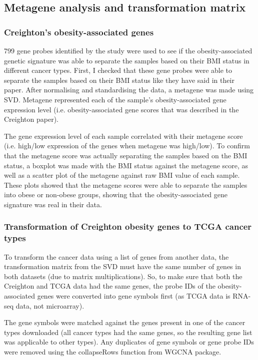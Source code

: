 \documentclass[a4paper, 11pt]{article}
\begin{document}
\subsection*{Metagene analysis and transformation matrix}

\subsubsection*{Creighton's obesity-associated genes}

799 gene probes identified by the study were used to see if the obesity-associated genetic signature was able to separate the samples based on their BMI status in different cancer types.
First, I checked that these gene probes were able to separate the samples based on their BMI status like they have said in their paper.
After normalising and standardising the data, a metagene  was made using SVD.
Metagene represented each of the sample's obesity-associated gene expression level (i.e. obesity-associated gene scores that was described in the Creighton paper).

The gene expression level of each sample correlated with their metagene score (i.e. high/low expression of the genes when metagene was high/low).
To confirm that the metagene score was actually separating the samples based on the BMI status, a boxplot was made with the BMI status against the metagene score, as well as a scatter plot of the metagene against raw BMI value of each sample.
These plots showed that the metagene scores were able to separate the samples into obese or non-obese groups, showing that the obesity-associated gene signature was real in their data.

\subsubsection*{Transformation of Creighton obesity genes to TCGA cancer types}

To transform the cancer data using a list of genes from another data, the transformation matrix from the SVD must have the same number of genes in both datasets (due to matrix multiplications).
So, to make sure that both the Creighton and TCGA data had the same genes, the probe IDs of the obesity-associated genes were converted into gene symbols first (as TCGA data is RNA-seq data, not microarray).

The gene symbols were matched against the genes present in one of the cancer types downloaded (all cancer types had the same genes, so the resulting gene list was applicable to other types).
Any duplicates of gene symbols or gene probe IDs  were removed using the collapseRows function from WGCNA package.
\end{document}
